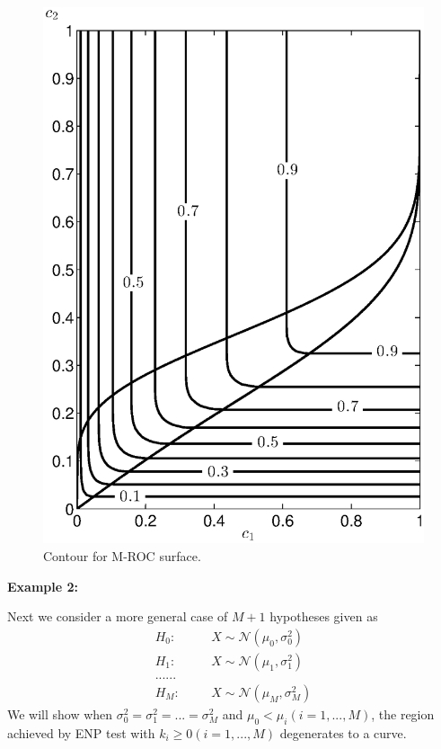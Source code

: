 \begin{figure}[!t]
\centering
\includegraphics[width=12cm]{3/LJcontour.eps}
\caption{Contour for M-ROC surface.}
\label{pic: LJS contour}
\end{figure}

\noindent \textbf{Example 2:}

Next we consider a more general case of $M+1$ hypotheses given as
\begin{equation}
\label{equ: m+1 Gaussian Hypo}
\begin{split}
H_0:\;\;\;\;\;\;&X\sim \mathcal{N}(\mu_0, \sigma_0^2)\\
H_1:\;\;\;\;\;\;&X\sim \mathcal{N}(\mu_1, \sigma_1^2)\\
  ......\\
H_M:\;\;\;\;\;\;&X\sim \mathcal{N}(\mu_M, \sigma_M^2)
\end{split}
\end{equation}
We will show when $\sigma_0^2 = \sigma_1^2 = ... = \sigma_M^2$ and $\mu_0 < \mu_i (i = 1, ..., M)$, the region achieved by ENP test with $k_i \geq 0 (i = 1, ..., M)$ degenerates to a curve.

